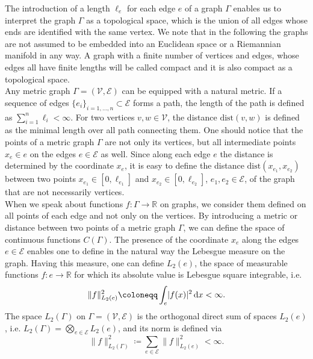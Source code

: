 The introduction of a length $\ell_e$ for each edge $e$ of a graph $\Gamma$ enables us to interpret the graph $\Gamma$ as a topological space, which is the union of all edges whose ends are identified with the same vertex. We note that in the following the graphs are not assumed to be embedded into an Euclidean space or a Riemannian manifold in any way. A graph with a finite number of vertices and edges, whose edges all have finite lengths will be called compact and it is also compact as a topological space. \\
Any metric graph $\Gamma = (\mathcal{V}, \mathcal{E})$ can be equipped with a natural metric. If a sequence of edges $\{ e_i \}_{i = 1, \ldots, n} \subset \mathcal{E}$ forms a path, the length of the path is defined as $\sum^{n}_{i=1} \ell_i < \infty$. For two vertices $v, w \in \mathcal{V}$, the distance $\mathrm{dist}(v,w)$ is defined as the minimal length over all path connecting them. One should notice that the points of a metric graph $\Gamma$ are not only its vertices, but all intermediate points $x_e \in e$ on the edges $e \in \mathcal{E}$ as well. Since along each edge $e$ the distance is determined by the coordinate $x_e$, it is easy to define the distance $\mathrm{dist}(x_{e_1},x_{e_2})$ between two points $x_{e_1} \in [0, \ell_{e_1}]$ and $x_{e_2} \in [0, \ell_{e_2}]$, $e_1, e_2 \in \mathcal{E}$, of the graph that are not necessarily vertices. \\
When we speak about functions $f \colon \Gamma \to \mathbb{R}$ on graphs, we consider them defined on all points of each edge and not only on the vertices. By introducing a metric or distance between two points of a metric graph $\Gamma$, we can define the space of continuous functions $C(\Gamma)$. The presence of the coordinate $x_e$ along the edges $e \in \mathcal{E}$ enables one to define in the natural way the Lebesgue measure on the graph. Having this measure, one can define $L_2(e)$, the space of measurable functions $f \colon e \to \mathbb{R}$ for which its absolute value is Lebesgue square integrable, i.e.
\begin{equation*}
    \lVert f \rVert^{2}_{L_2(e)} \coloneqq \int_e \lvert f(x) \rvert^2 \, \textup{d} x < \infty.
\end{equation*}
The space $L_2(\Gamma)$ on $\Gamma = (\mathcal{V}, \mathcal{E})$ is the orthogonal direct sum of spaces $L_2(e)$, i.e. $L_2(\Gamma) = \bigotimes_{e \in \mathcal{E}} L_2(e)$, and its norm is defined via
\begin{equation*} 
    \lVert f \rVert^{2}_{L_2(\Gamma)} \coloneqq \sum_{e \in \mathcal{E}} \lVert f \rVert^{2}_{L_2(e)} < \infty.
\end{equation*} 

